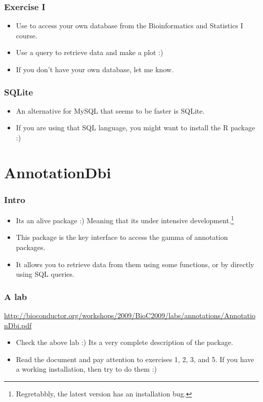 \begin{frame}[allowframebreaks]
  \frametitle{Exercise I}
  \begin{itemize}
  \item Use  to access your own database from the Bioinformatics and Statistics I course.
  \item Use a query to retrieve data and make a plot :)
  \item If you don't have your own database, let me know.
  \end{itemize}
\end{frame}

\begin{frame}[allowframebreaks]
  \frametitle{SQLite}
  \begin{itemize}
  \item An alternative for MySQL that seems to be faster is SQLite.
  \item If you are using that SQL language, you might want to install the  R package :)
  \end{itemize}
\end{frame}

\section{AnnotationDbi}

\begin{frame}[allowframebreaks]
  \frametitle{Intro}
  \begin{itemize}
  \item Its an alive package :) Meaning that its under intensive development.\footnote{Regretabbly, the latest version has an installation bug.} 
  \item This package is the key interface to access the gamma of annotation packages.
  \item It allows you to retrieve data from them using some  functions, or by directly using SQL queries.
  \end{itemize}
\end{frame}


\begin{frame}[allowframebreaks]
  \frametitle{A lab}
  \url{http://bioconductor.org/workshops/2009/BioC2009/labs/annotations/AnnotationDbi.pdf}
  \begin{itemize}
  \item Check the above lab :) Its a very complete description of the  package.
  \item Read the document and pay attention to exercises 1, 2, 3, and 5. If you have a working installation, then try to do them :)
  \end{itemize}
\end{frame}


